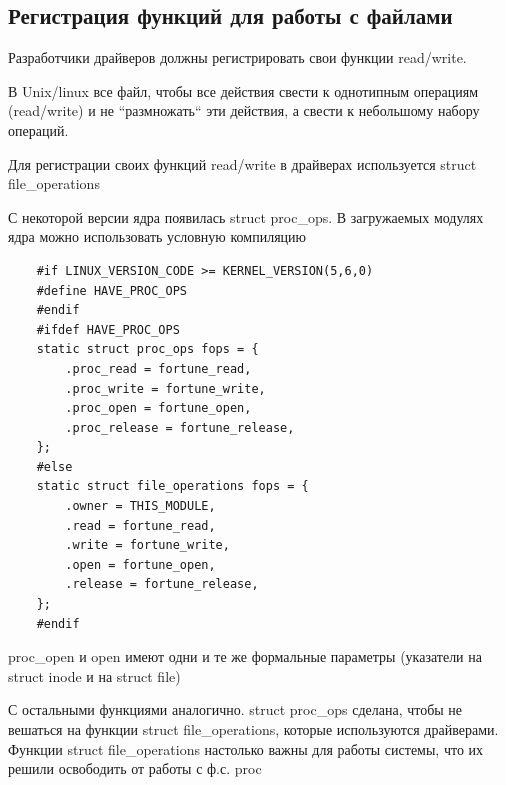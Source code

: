 \subsection{Регистрация функций для работы с файлами}
Разработчики драйверов должны регистрировать свои функции read/write.

В Unix/linux все файл, чтобы все действия свести к однотипным операциям (read/write) и не ``размножать`` эти действия, а свести к небольшому набору операций.

Для регистрации своих функций read/write в драйверах используется struct file\_operations

С некоторой версии ядра появилась struct proc\_ops. В загружаемых модулях ядра можно использовать условную компиляцию
\begin{lstlisting}
	#if LINUX_VERSION_CODE >= KERNEL_VERSION(5,6,0)
	#define HAVE_PROC_OPS
	#endif
	#ifdef HAVE_PROC_OPS
	static struct proc_ops fops = {
		.proc_read = fortune_read,
		.proc_write = fortune_write,
		.proc_open = fortune_open,
		.proc_release = fortune_release,
	};
	#else
	static struct file_operations fops = {
		.owner = THIS_MODULE,
		.read = fortune_read,
		.write = fortune_write,
		.open = fortune_open,
		.release = fortune_release,
	};
	#endif
	\end{lstlisting}
	
	proc\_open и open имеют одни и те же формальные параметры (указатели на struct inode и на struct file)
	
	С остальными функциями аналогично. struct proc\_ops сделана, чтобы не вешаться на функции struct file\_operations, которые используются драйверами. Функции struct file\_operations настолько важны для работы системы, что их решили освободить от работы с ф.с. proc 
	
